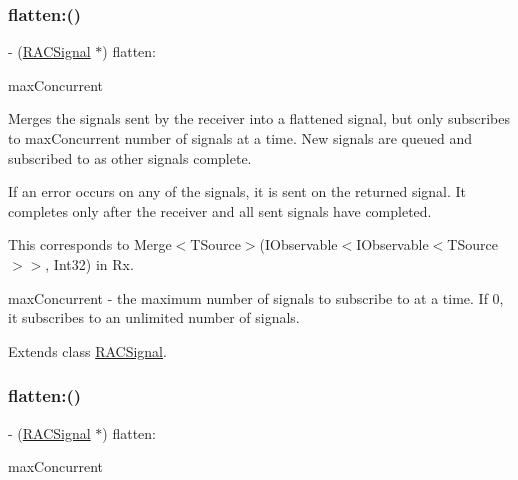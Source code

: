 \subsubsection{\texorpdfstring{flatten\+:()}{flatten:()}\hspace{0.1cm}{\footnotesize\ttfamily [1/3]}}
{\footnotesize\ttfamily -\/ (\mbox{\hyperlink{interface_r_a_c_signal}{R\+A\+C\+Signal}} $\ast$) flatten\+: \begin{DoxyParamCaption}\item[{(N\+S\+U\+Integer)}]{max\+Concurrent }\end{DoxyParamCaption}}

Merges the signals sent by the receiver into a flattened signal, but only subscribes to {\ttfamily max\+Concurrent} number of signals at a time. New signals are queued and subscribed to as other signals complete.

If an error occurs on any of the signals, it is sent on the returned signal. It completes only after the receiver and all sent signals have completed.

This corresponds to {\ttfamily Merge$<$T\+Source$>$(I\+Observable$<$I\+Observable$<$T\+Source$>$$>$, Int32)} in Rx.

max\+Concurrent -\/ the maximum number of signals to subscribe to at a time. If 0, it subscribes to an unlimited number of signals. 

Extends class \mbox{\hyperlink{interface_r_a_c_signal_a72e5f2fd80960ee5422e08ceef0f4e2c}{R\+A\+C\+Signal}}.

\mbox{\label{category_r_a_c_signal_07_operations_08_a72e5f2fd80960ee5422e08ceef0f4e2c}} 
\subsubsection{\texorpdfstring{flatten\+:()}{flatten:()}\hspace{0.1cm}{\footnotesize\ttfamily [2/3]}}
{\footnotesize\ttfamily -\/ (\mbox{\hyperlink{interface_r_a_c_signal}{R\+A\+C\+Signal}} $\ast$) flatten\+: \begin{DoxyParamCaption}\item[{(N\+S\+U\+Integer)}]{max\+Concurrent }\end{DoxyParamCaption}}

